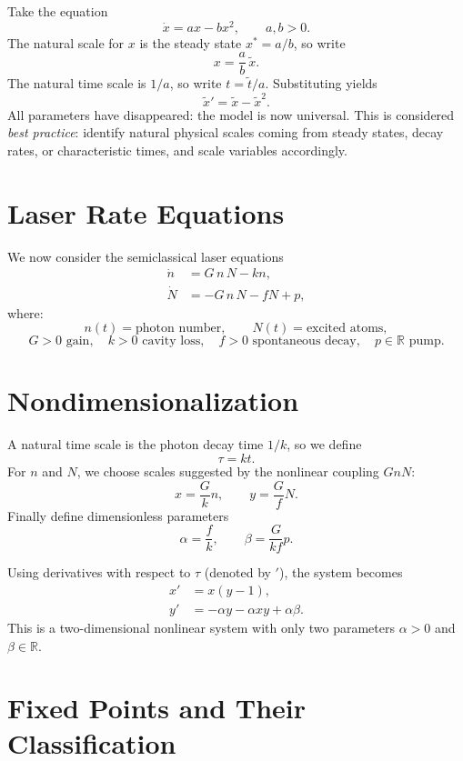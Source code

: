 \documentclass[11pt]{amsart}
\begin{document}
Take the equation
\[
\dot x = ax - bx^2, \qquad a,b>0.
\]
The natural scale for $x$ is the steady state $x^\ast = a/b$, so write
\[
x = \frac{a}{b}\,\tilde x.
\]
The natural time scale is $1/a$, so write $t = \tilde t / a$.  
Substituting yields
\[
\tilde x' = \tilde x - \tilde x^2.
\]
All parameters have disappeared: the model is now universal.
This is considered \emph{best practice}: identify natural physical scales coming
from steady states, decay rates, or characteristic times, and scale variables
accordingly.

\vspace{1em}
\section{Laser Rate Equations}

We now consider the semiclassical laser equations
\begin{align}
\dot n &= G\, n\, N - k n , \label{eq:n}\\[2mm]
\dot N &= - G\, n\, N - f N + p , \label{eq:N}
\end{align}
where:
\[
n(t)=\text{photon number},\qquad
N(t)=\text{excited atoms},
\]
\[
G > 0 \text{ gain}, \quad
k>0 \text{ cavity loss}, \quad
f >0  \text{ spontaneous decay}, \quad
p\in\mathbb{R} \text{ pump}.
\]

\section{Nondimensionalization}

A natural time scale is the photon decay time $1/k$, so we define
\[
\tau = k t.
\]
For $n$ and $N$, we choose scales suggested by the nonlinear coupling $G n N$:
\[
x = \frac{G}{k}n, \qquad y = \frac{G}{f}N.
\]
Finally define dimensionless parameters
\[
\alpha = \frac{f}{k}, \qquad
\beta  = \frac{G}{kf}p.
\]

Using derivatives with respect to $\tau$ (denoted by $'$), the system becomes
\begin{align}
x' &= x (y - 1), \label{eq:x}\\
y' &= - \alpha y - \alpha x y + \alpha \beta. \label{eq:y}
\end{align}
This is a two-dimensional nonlinear system with only two parameters
$\alpha>0$ and $\beta\in\mathbb{R}$.

\vspace{1em}
\section{Fixed Points and Their Classification}
\end{document}
